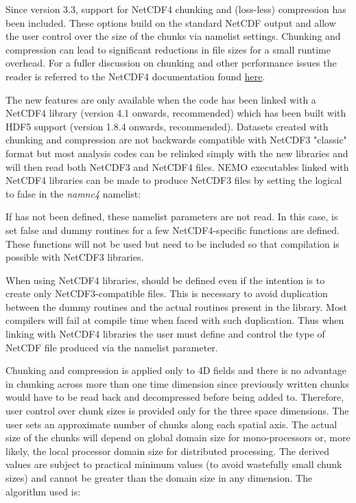 \documentclass[NEMO_book]{subfiles}
\begin{document}
Since version 3.3, support for NetCDF4 chunking and (loss-less) compression has
been included.  These options build on the standard NetCDF output and allow
the user control over the size of the chunks via namelist settings. Chunking
and compression can lead to significant reductions in file sizes for a small
runtime overhead. For a fuller discussion on chunking and other performance
issues the reader is referred to the NetCDF4 documentation found 
\href{http://www.unidata.ucar.edu/software/netcdf/docs/netcdf.html#Chunking}{here}.

The new features are only available when the code has been linked with a
NetCDF4 library (version 4.1 onwards, recommended) which has been built
with HDF5 support (version 1.8.4 onwards, recommended). Datasets created
with chunking and compression are not backwards compatible with NetCDF3
"classic" format but most analysis codes can be relinked simply with the
new libraries and will then read both NetCDF3 and NetCDF4 files. NEMO
executables linked with NetCDF4 libraries can be made to produce NetCDF3
files by setting the  logical to false in the \textit{namnc4} 
namelist:


If  has not been defined, these namelist parameters are not read. 
In this case,  is set false and dummy routines for a few
NetCDF4-specific functions are defined. These functions will not be used but
need to be included so that compilation is possible with NetCDF3 libraries.

When using NetCDF4 libraries,  should be defined even if the
intention is to create only NetCDF3-compatible files. This is necessary to
avoid duplication between the dummy routines and the actual routines present
in the library. Most compilers will fail at compile time when faced with
such duplication. Thus when linking with NetCDF4 libraries the user must
define  and control the type of NetCDF file produced via the
namelist parameter.

Chunking and compression is applied only to 4D fields and there is no
advantage in chunking across more than one time dimension since previously
written chunks would have to be read back and decompressed before being
added to. Therefore, user control over chunk sizes is provided only for the
three space dimensions. The user sets an approximate number of chunks along
each spatial axis. The actual size of the chunks will depend on global domain
size for mono-processors or, more likely, the local processor domain size for
distributed processing. The derived values are subject to practical minimum
values (to avoid wastefully small chunk sizes) and cannot be greater than the
domain size in any dimension. The algorithm used is:
\end{document}
